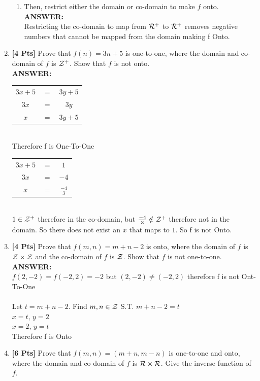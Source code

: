 \documentclass[12pt]{article}
\begin{document}
\begin{enumerate}
\begin{enumerate}
\item Then, restrict either the domain or co-domain to make $f$ onto.\\
	\textbf{ANSWER:}\\
	Restricting the co-domain to map from $\cal R^+$ to $\cal R^+$ removes negative numbers that cannot be mapped from the domain making f Onto.  \\
	
\end{enumerate}

\item {\bf [4 Pts]} Prove that $f(n) = 3n + 5$ is one-to-one,  where the domain and co-domain of $f$ is $\cal Z^+$. Show that $f$ is not onto.\\
	\textbf{ANSWER:}
\begin{table}[h]
\centering
\begin{tabular}{ccc}
$3x + 5$ & $=$ & $3y + 5$ \\
$3x$     & $=$ & $3y$     \\
$x$      & $=$ & $3y + 5$
\end{tabular}
\end{table}\\
Therefore f is One-To-One\\
\begin{table}[h]
\centering
\begin{tabular}{ccc}
$3x + 5$ & $=$ & $1$            \\
$3x$     & $=$ & $-4$           \\
$x$      & $=$ & $\frac{-4}{3}$
\end{tabular}
\end{table}\\
$1 \in \cal Z^+$ therefore in the co-domain, but $\frac{-4}{3} \notin \cal Z^+$ therefore  not in the domain. So there does not exist an $x$ that maps to $1$. So f is not Onto.
	
\clearpage
\item {\bf [4 Pts]} Prove that $f(m,n) = m + n - 2$ is onto,  where the domain of $f$ is ${\cal Z} \times {\cal Z}$ and the co-domain of $f$ is $\cal Z$. Show that $f$ is not one-to-one. \\
	\textbf{ANSWER:}\\
	$f(2,-2) = f(-2,2) = -2$ but $(2,-2) \neq (-2,2)$ therefore f is not Ont-To-One\\\\
	
	Let $t = m+n-2$. Find $m,n \in \cal Z$ S.T. $m+n - 2 = t$\\
	$x=t$, $y=2$\\
	$x=2$, $y=t$\\
	Therefore f is Onto
				
\item {\bf [6 Pts]} Prove that $f(m,n) = (m+n, m-n)$ is one-to-one and onto,  where the domain and co-domain of $f$ is ${\cal R} \times {\cal R}$.
         Give the inverse function of $f$.

\end{enumerate}
\end{document}
